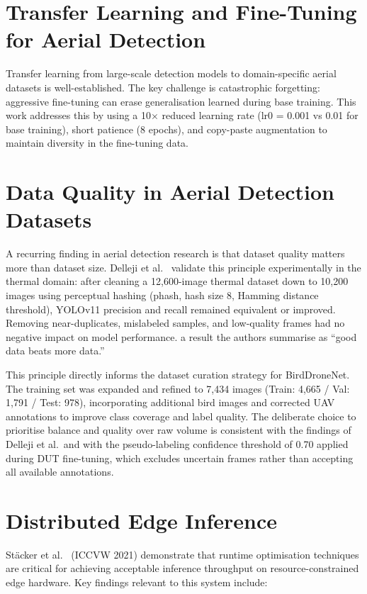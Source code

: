 \documentclass[12pt,a4paper]{report}
\begin{document}
\section{Transfer Learning and Fine-Tuning for Aerial Detection}

Transfer learning from large-scale detection models to domain-specific
aerial datasets is well-established. The key challenge is catastrophic
forgetting: aggressive fine-tuning can erase generalisation learned during
base training. This work addresses this by using a 10$\times$ reduced
learning rate (lr0 = 0.001 vs 0.01 for base training), short patience
(8 epochs), and copy-paste augmentation to maintain diversity in the
fine-tuning data.

\section{Data Quality in Aerial Detection Datasets}

A recurring finding in aerial detection research is that dataset quality
matters more than dataset size. Delleji et al.~\cite{delleji2025thermal}
validate this principle experimentally in the thermal domain: after
cleaning a 12,600-image thermal dataset down to 10,200 images using
perceptual hashing (phash, hash size 8, Hamming distance threshold),
YOLOv11 precision and recall remained equivalent or improved. Removing
near-duplicates, mislabeled samples, and low-quality frames had no
negative impact on model performance. a result the authors summarise
as ``good data beats more data.''

This principle directly informs the dataset curation strategy for
BirdDroneNet. The training set was expanded and refined to 7,434 images
(Train: 4,665 / Val: 1,791 / Test: 978), incorporating additional bird
images and corrected UAV annotations to improve class coverage and label
quality. The deliberate choice to prioritise balance and quality over raw
volume is consistent with the findings of Delleji et al.\ and with the
pseudo-labeling confidence threshold of 0.70 applied during DUT
fine-tuning, which excludes uncertain frames rather than accepting
all available annotations.

\section{Distributed Edge Inference}

Stäcker et al.~\cite{stacker2021} (ICCVW 2021) demonstrate that runtime
optimisation techniques are critical for achieving acceptable inference throughput
on resource-constrained edge hardware. Key findings relevant to this system include:
\end{document}
